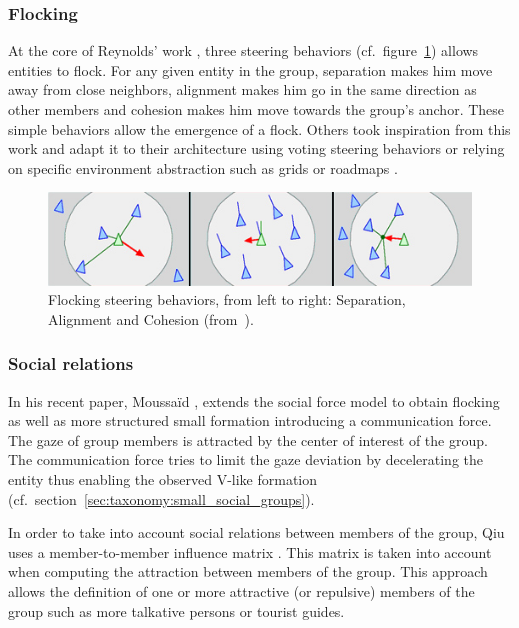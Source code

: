 \documentclass[a4paper,titlepage]{article}
\begin{document}
\subsubsection{Flocking}

At the core of Reynolds’ work \cite{Reynolds:1987vm,Reynolds:1999vr}, three steering behaviors (cf.\ figure~\ref{fig:flocking_steering_behaviors}) allows entities to flock. For any given entity in the group, separation makes him move away from close neighbors, alignment makes him go in the same direction as other members and cohesion makes him move towards the group’s anchor. These simple behaviors allow the emergence of a flock. Others took inspiration from this work and adapt it to their architecture using voting steering behaviors \cite{Hostetler:2002wg} or relying on specific environment abstraction such as grids \cite{Loscos:2003wh} or roadmaps \cite{Bayazit:2003up,Kamphuis:2004ct}.

\begin{figure}[h]
\centering
\includegraphics[width=\textwidth]{FlockingSteeringBehaviors.jpg}
\caption{Flocking steering behaviors, from left to right: Separation, Alignment and Cohesion (from~\cite{Reynolds:1999vr}).}
\label{fig:flocking_steering_behaviors}
\end{figure}

\subsubsection{Social relations}

In his recent paper, Moussaïd \cite{Moussaid:2010ib}, extends the social force model \cite{Helbing:2000vh} to obtain flocking as well as more structured small formation introducing a communication force. The gaze of group members is attracted by the center of interest of the group. The communication force tries to limit the gaze deviation by decelerating the entity thus enabling the observed V-like formation (cf.\ section~\ref{sec:taxonomy:small_social_groups}).

In order to take into account social relations between members of the group, Qiu uses a member-to-member influence matrix \cite{Qiu:2010ks}. This matrix is taken into account when computing the attraction between members of the group. This approach allows the definition of one or more attractive (or repulsive) members of the group such as more talkative persons or tourist guides.
\end{document}
